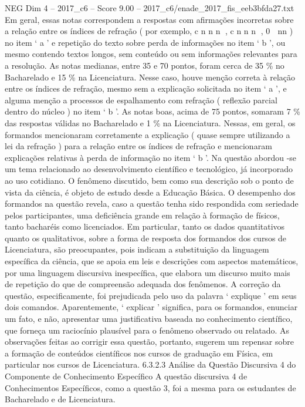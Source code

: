 \begin{textsample}{NEG Dim 4 – 2017\_c6 – Score 9.00 – 2017\_c6/enade\_2017\_fis\_eeb3bfda27.txt}
Em geral, essas notas correspondem a respostas com afirmações incorretas sobre a relação entre os índices de refração ( por exemplo, c n n n , c n n n , 0  nn ) no item ‘ a ’ e repetição do texto sobre perda de informações no item ‘ b ’, ou mesmo contendo textos longos, sem conteúdo ou sem informações relevantes para a resolução.
As notas medianas, entre 35 e 70 pontos, foram cerca de 35 \% no Bacharelado e 15 \% na Licenciatura.
Nesse caso, houve menção correta à relação entre os índices de refração, mesmo sem a explicação solicitada no item ‘ a ’, e alguma menção a processos de espalhamento com refração ( reflexão parcial dentro do núcleo ) no item ‘ b ’.
As notas boas, acima de 75 pontos, somaram 7 \% das respostas válidas no Bacharelado e 1 \% na Licenciatura.
Nessas, em geral, os formandos mencionaram corretamente a explicação ( quase sempre utilizando a lei da refração ) para a relação entre os índices de refração e mencionaram explicações relativas à perda de informação no item ‘ b ’.
Na questão abordou -se um tema relacionado ao desenvolvimento científico e tecnológico, já incorporado ao uso cotidiano.
O fenômeno discutido, bem como sua descrição sob o ponto de vista da ciência, é objeto de estudo desde a Educação Básica.
O desempenho dos formandos na questão revela, caso a questão tenha sido respondida com seriedade pelos participantes, uma deficiência grande em relação à formação de físicos, tanto bacharéis como licenciados.
Em particular, tanto os dados quantitativos quanto os qualitativos, sobre a forma de resposta dos formandos dos cursos de Licenciatura, são preocupantes, pois indicam a substituição da linguagem específica da ciência, que se apoia em leis e descrições com aspectos matemáticos, por uma linguagem discursiva inespecífica, que elabora um discurso muito mais de repetição do que de compreensão adequada dos fenômenos.
A correção da questão, especificamente, foi prejudicada pelo uso da palavra ‘ explique ’ em seus dois comandos.
Aparentemente, ‘ explicar ’ significa, para os formandos, enunciar um fato, e não, apresentar uma justificativa baseada no conhecimento científico, que forneça um raciocínio plausível para o fenômeno observado ou relatado.
As observações feitas ao corrigir essa questão, portanto, sugerem um repensar sobre a formação de conteúdos científicos nos cursos de graduação em Física, em particular nos cursos de Licenciatura. 6.3.2.3 Análise da Questão Discursiva 4 do Componente de Conhecimento Específico A questão discursiva 4 de Conhecimentos Específicos, como a questão 3, foi a mesma para os estudantes de Bacharelado e de Licenciatura.

\end{textsample}
